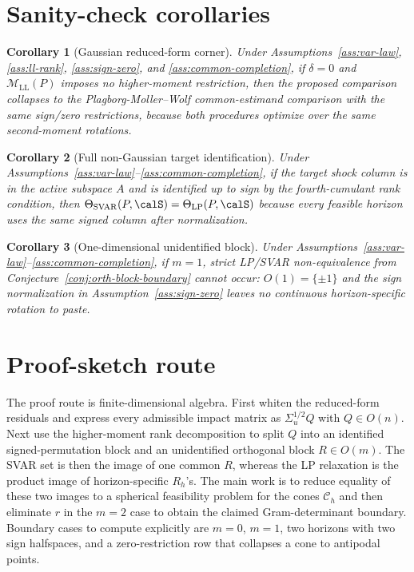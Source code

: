 \documentclass[11pt]{article}
\theoremstyle{definition}
\theoremstyle{plain}
\newtheorem{corollary}{Corollary}
\theoremstyle{remark}
\begin{document}
\section{Sanity-check corollaries}
\begin{corollary}[Gaussian reduced-form corner]\label{cor:gaussian}
Under Assumptions~\ref{ass:var-law}, \ref{ass:ll-rank}, \ref{ass:sign-zero}, and \ref{ass:common-completion}, if $\delta=0$ and $\mathcal{M}_{\mathrm{LL}}(P)$ imposes no higher-moment restriction, then the proposed comparison collapses to the Plagborg-Moller--Wolf common-estimand comparison with the same sign/zero restrictions, because both procedures optimize over the same second-moment rotations.
\end{corollary}

\begin{corollary}[Full non-Gaussian target identification]\label{cor:full-rank}
Under Assumptions~\ref{ass:var-law}--\ref{ass:common-completion}, if the target shock column is in the active subspace $A$ and is identified up to sign by the fourth-cumulant rank condition, then $\Theta_{\mathrm{SVAR}}(P,\calS)=\Theta_{\mathrm{LP}}(P,\calS)$ because every feasible horizon uses the same signed column after normalization.
\end{corollary}

\begin{corollary}[One-dimensional unidentified block]\label{cor:one-d}
Under Assumptions~\ref{ass:var-law}--\ref{ass:common-completion}, if $m=1$, strict LP/SVAR non-equivalence from Conjecture~\ref{conj:orth-block-boundary} cannot occur: $O(1)=\{\pm1\}$ and the sign normalization in Assumption~\ref{ass:sign-zero} leaves no continuous horizon-specific rotation to paste.
\end{corollary}

\section{Proof-sketch route}
The proof route is finite-dimensional algebra.  First whiten the reduced-form residuals and express every admissible impact matrix as $\Sigma_u^{1/2}Q$ with $Q\in O(n)$.  Next use the higher-moment rank decomposition to split $Q$ into an identified signed-permutation block and an unidentified orthogonal block $R\in O(m)$.  The SVAR set is then the image of one common $R$, whereas the LP relaxation is the product image of horizon-specific $R_h$'s.  The main work is to reduce equality of these two images to a spherical feasibility problem for the cones $\mathcal{C}_h$ and then eliminate $r$ in the $m=2$ case to obtain the claimed Gram-determinant boundary.  Boundary cases to compute explicitly are $m=0$, $m=1$, two horizons with two sign halfspaces, and a zero-restriction row that collapses a cone to antipodal points.
\end{document}
